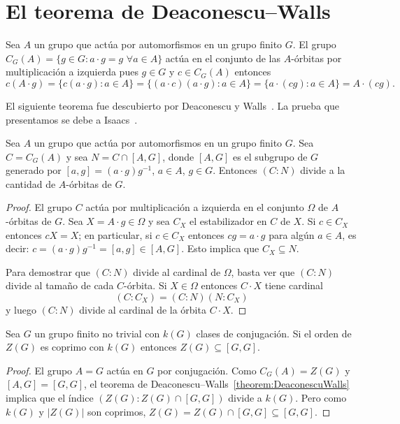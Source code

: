 \chapter{El teorema de Deaconescu--Walls}

Sea $A$ un grupo que actúa por automorfismos en un grupo finito $G$. El grupo
$C_{G}(A)=\{g\in G:a\cdot g=g\,\,\forall a\in A\}$ actúa en el conjunto de las
$A$-órbitas por multiplicación a izquierda 
pues $g\in G$ y $c\in C_G(A)$ entonces
\[
  c(A\cdot g)
  =\{c(a\cdot g):a\in A\}
  =\{(a\cdot c)(a\cdot g):a\in A\}
  =\{a\cdot (cg):a\in A\}
  =A\cdot (cg).
\]

El siguiente teorema fue descubierto por Deaconescu y Walls~\cite{MR2164558}. 
La prueba que presentamos se debe a Isaacs~\cite{MR2922681}. 

\begin{theorem}
	\label{theorem:DeaconescuWalls}
	Sea $A$ un grupo que actúa por automorfismos en un grupo finito $G$. Sea
	$C=C_{G}(A)$ y sea $N=C\cap [A,G]$,
	donde $[A,G]$ es el subgrupo de $G$ generado por $[a,g]=(a\cdot g)g^{-1}$,
	$a\in A$, $g\in G$.  Entonces $(C:N)$ divide a la cantidad de $A$-órbitas de
	$G$. 
\end{theorem}

\begin{proof}
  El grupo $C$ actúa por multiplicación a izquierda en el conjunto $\Omega$ de
  $A$-órbitas de $G$. Sea $X=A\cdot g\in\Omega$ y sea $C_X$ el estabilizador en
  $C$ de $X$. Si $c\in C_X$ entonces $cX=X$; en particular, si $c\in C_X$
  entonces $cg=a\cdot g$ para algún $a\in A$, es decir: $c=(a\cdot
  g)g^{-1}=[a,g]\in [A,G]$. Esto implica que $C_X\subseteq N$.

  Para demostrar que $(C:N)$ divide al cardinal de $\Omega$, basta ver que
  $(C:N)$ divide al tamaño de cada $C$-órbita. Si $X\in\Omega$ entonces $C\cdot
  X$ tiene cardinal
  \[
	(C:C_X)=(C:N)(N:C_X)
  \]
  y luego $(C:N)$ divide al cardinal de la órbita $C\cdot X$.
\end{proof}

\begin{corollary}
	\label{corollary:Z(G)subset[G,G]}
  Sea $G$ un grupo finito no trivial con $k(G)$ clases 
  de conjugación. Si el orden de $Z(G)$ es coprimo con $k(G)$ 
  entonces $Z(G)\subseteq[G,G]$.
\end{corollary}

\begin{proof}
	El grupo $A=G$ actúa en $G$ por conjugación. Como $C_G(A)=Z(G)$ y
	$[A,G]=[G,G]$, el teorema de
	Deaconescu--Walls~\ref{theorem:DeaconescuWalls} implica que  el índice
	$(Z(G):Z(G)\cap [G,G])$ divide a $k(G)$. Pero como $k(G)$ y $|Z(G)|$ son
	coprimos, $Z(G)=Z(G)\cap [G,G]\subseteq [G,G]$. 
\end{proof}

